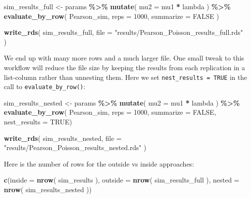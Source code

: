 \documentclass[
]{book}
\newenvironment{Shaded}{\begin{snugshade}}{\end{snugshade}}
\newcommand{\AttributeTok}[1]{\textcolor[rgb]{0.13,0.29,0.53}{#1}}
\newcommand{\ConstantTok}[1]{\textcolor[rgb]{0.56,0.35,0.01}{#1}}
\newcommand{\DecValTok}[1]{\textcolor[rgb]{0.00,0.00,0.81}{#1}}
\newcommand{\FunctionTok}[1]{\textcolor[rgb]{0.13,0.29,0.53}{\textbf{#1}}}
\newcommand{\NormalTok}[1]{#1}
\newcommand{\OtherTok}[1]{\textcolor[rgb]{0.56,0.35,0.01}{#1}}
\newcommand{\SpecialCharTok}[1]{\textcolor[rgb]{0.81,0.36,0.00}{\textbf{#1}}}
\newcommand{\StringTok}[1]{\textcolor[rgb]{0.31,0.60,0.02}{#1}}
\begin{document}
\begin{Shaded}
\begin{Highlighting}[]
\NormalTok{sim\_results\_full }\OtherTok{\textless{}{-}} 
\NormalTok{  params }\SpecialCharTok{\%\textgreater{}\%}
  \FunctionTok{mutate}\NormalTok{( }\AttributeTok{mu2 =}\NormalTok{ mu1 }\SpecialCharTok{*}\NormalTok{ lambda ) }\SpecialCharTok{\%\textgreater{}\%}
  \FunctionTok{evaluate\_by\_row}\NormalTok{( Pearson\_sim, }\AttributeTok{reps =} \DecValTok{1000}\NormalTok{, }\AttributeTok{summarize =} \ConstantTok{FALSE}\NormalTok{ )}

\FunctionTok{write\_rds}\NormalTok{( sim\_results\_full, }\AttributeTok{file =} \StringTok{"results/Pearson\_Poisson\_results\_full.rds"}\NormalTok{ )}
\end{Highlighting}
\end{Shaded}

We end up with many more rows and a much larger file.
One small tweak to this workflow will reduce the file size by keeping the results from each replication in a list-column rather than unnesting them. Here we set \texttt{nest\_results\ =\ TRUE} in the call to \texttt{evaluate\_by\_row()}:

\begin{Shaded}
\begin{Highlighting}[]
\NormalTok{sim\_results\_nested }\OtherTok{\textless{}{-}} 
\NormalTok{  params }\SpecialCharTok{\%\textgreater{}\%}
  \FunctionTok{mutate}\NormalTok{( }\AttributeTok{mu2 =}\NormalTok{ mu1 }\SpecialCharTok{*}\NormalTok{ lambda ) }\SpecialCharTok{\%\textgreater{}\%}
  \FunctionTok{evaluate\_by\_row}\NormalTok{( Pearson\_sim, }\AttributeTok{reps =} \DecValTok{1000}\NormalTok{, }\AttributeTok{summarize =} \ConstantTok{FALSE}\NormalTok{, }\AttributeTok{nest\_results =} \ConstantTok{TRUE}\NormalTok{)}

\FunctionTok{write\_rds}\NormalTok{( sim\_results\_nested, }\AttributeTok{file =} \StringTok{"results/Pearson\_Poisson\_results\_nested.rds"}\NormalTok{ )}
\end{Highlighting}
\end{Shaded}

Here is the number of rows for the outside vs inside approaches:

\begin{Shaded}
\begin{Highlighting}[]
\FunctionTok{c}\NormalTok{(}\AttributeTok{inside =} \FunctionTok{nrow}\NormalTok{( sim\_results ), }\AttributeTok{outside =} \FunctionTok{nrow}\NormalTok{( sim\_results\_full ), }\AttributeTok{nested =} \FunctionTok{nrow}\NormalTok{( sim\_results\_nested ))}
\end{Highlighting}
\end{Shaded}
\end{document}
